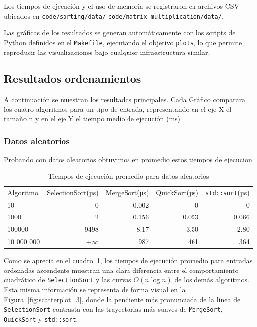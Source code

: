 Los tiempos de ejecución y el uso de memoria se registraron en archivos CSV ubicados en \texttt{code/sorting/data/} \texttt{code/matrix\_multiplication/data/}. 

Las gráficas de los resultados se generan automáticamente con los scripts de Python definidos en el \texttt{Makefile}, ejecutando el objetivo \texttt{plots}, lo que permite reproducir las visualizaciones bajo cualquier infraestructura similar.

\subsection*{Resultados ordenamientos}

A continuación se muestran los resultados principales. Cada Gráfico comparara los cuatro algoritmos para un tipo de entrada, representando en el eje X el tamaño n y en el eje Y el tiempo medio de ejecución (ms)




\subsubsection*{Datos aleatorios}
Probando con datos aleatorios obtuvimos en promedio estos tiempos de ejecucion

\begin{table}[ht]
  \centering
  \begin{tabular}{lrrrr}

    Algoritmo  & SelectionSort\.(µs) & MergeSort\.(µs) & QuickSort\.(µs)  & \texttt{std::sort}\.(µs) \\

    10  & 0 & 0.002 & 0 & 0 \\
    1000& 2& 0.156& 0.053 & 0.066\\
    100000& 9498& 8.17&3.50&2.80\\
    10 000 000 & +$\infty$ & 987& 461 &364\\

  \end{tabular}
  \caption{Tiempos de ejecución promedio para datos aleatorios}
  \label{tab:sorting-results}
\end{table}


Como se aprecia en el cuadro~\ref{tab:sorting-results}, los tiempos de ejecución promedio para entradas ordenadas ascendente muestran una clara diferencia entre el comportamiento cuadrático de \texttt{SelectionSort} y las curvas $O(n\log n)$ de los demás algoritmos. Esta misma información se representa de forma visual en la Figura~\ref{fig:scatterplot_3}, donde la pendiente más pronunciada de la línea de \texttt{SelectionSort} contrasta con las trayectorias más suaves de \texttt{MergeSort}, \texttt{QuickSort} y \texttt{std::sort}.  

